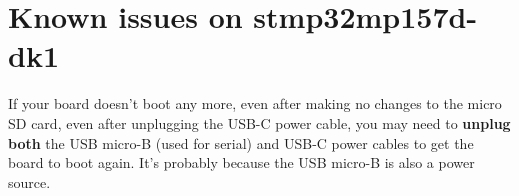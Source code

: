 \section{Known issues on stmp32mp157d-dk1}

If your board doesn't boot any more, even after making no changes to the
micro SD card, even after unplugging the USB-C power cable, you may need
to {\bf unplug both} the USB micro-B (used for serial) and USB-C power cables
to get the board to boot again. It's probably because the USB micro-B is
also a power source.

